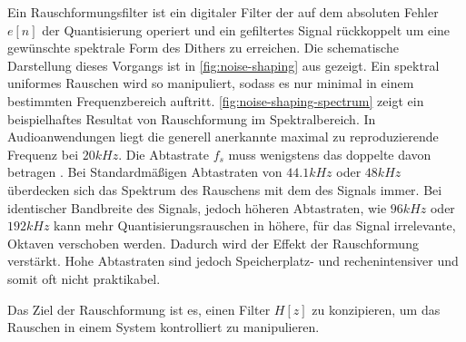 Ein Rauschformungsfilter ist ein digitaler Filter der auf dem absoluten Fehler $e[n]$ der Quantisierung operiert und ein gefiltertes Signal rückkoppelt um eine gewünschte spektrale Form des Dithers zu erreichen.
Die schematische Darstellung dieses Vorgangs ist in \autoref{fig:noise-shaping} aus \autocite[S. 148]{noise-shaping} gezeigt.
Ein spektral uniformes Rauschen wird so manipuliert, sodass es nur minimal in einem bestimmten Frequenzbereich auftritt.
\autoref{fig:noise-shaping-spectrum} zeigt ein beispielhaftes Resultat von Rauschformung im Spektralbereich.
In Audioanwendungen liegt die generell anerkannte maximal zu reproduzierende Frequenz bei $20\si{kHz}$.
Die Abtastrate $f_s$ muss wenigstens das doppelte davon betragen \autocite[S. 11 f.]{shannon}.
Bei Standardmäßigen Abtastraten von $44.1\si{kHz}$ oder $48\si{kHz}$ überdecken sich das Spektrum des Rauschens mit dem des Signals immer.
Bei identischer Bandbreite des Signals, jedoch höheren Abtastraten, wie $96\si{kHz}$ oder $192\si{kHz}$ kann mehr Quantisierungsrauschen in höhere, für das Signal irrelevante, Oktaven verschoben werden.
Dadurch wird der Effekt der Rauschformung verstärkt.
Hohe Abtastraten sind jedoch Speicherplatz- und rechenintensiver und somit oft nicht praktikabel.

Das Ziel der Rauschformung ist es, einen Filter $H[z]$ zu konzipieren, um das Rauschen in einem System kontrolliert zu manipulieren.

